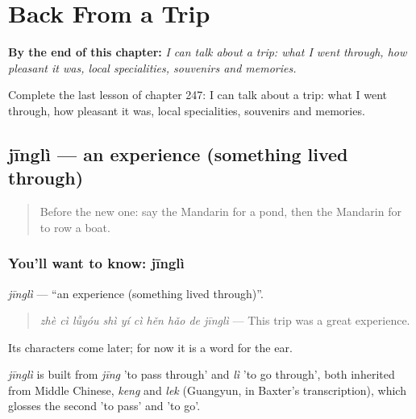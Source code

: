 
\chapter{Back From a Trip}
\label{ch:zh-back-from-a-trip}

\begin{chapteropening}
\textbf{By the end of this chapter:} \emph{I can talk about a trip: what I went through, how pleasant it was, local specialities, souvenirs and memories.}

Complete the last lesson of chapter 247: I can talk about a trip: what I went through, how pleasant it was, local specialities, souvenirs and memories.
\end{chapteropening}

\section[jīnglì]{jīnglì — an experience (something lived through)}

\label{lesson:ZH-C247-jingli}



\begin{quote}
Before the new one: say the Mandarin for a pond, then the Mandarin for to row a boat.
\end{quote}

\subsection*{You'll want to know: jīnglì}
\emph{jīnglì} — \textquotedblleft{}an experience (something lived through)\textquotedblright{}.

\begin{quote}
\emph{zhè cì lǚyóu shì yí cì hěn hǎo de jīnglì} — This trip was a great experience.
\end{quote}

Its characters come later; for now it is a word for the ear.

\begin{cousinweb}
\emph{jīnglì} is built from \emph{jīng} 'to pass through' and \emph{lì} 'to go through', both inherited from Middle Chinese, \emph{keng} and \emph{lek} (Guangyun, in Baxter's transcription), which glosses the second 'to pass' and 'to go'.
\end{cousinweb}

